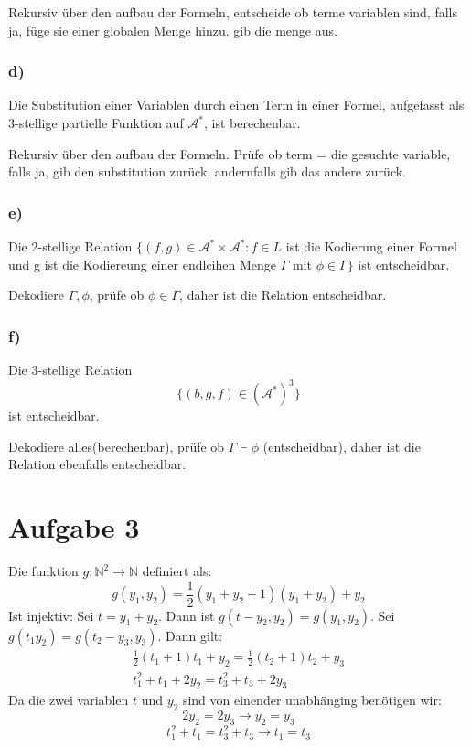 \documentclass[12pt]{article}
\begin{document}
Rekursiv über den aufbau der Formeln, entscheide ob terme variablen sind, falls ja, füge sie einer globalen Menge hinzu. gib die menge aus.

\subsubsection*{d)}
Die Substitution einer Variablen durch einen Term in einer Formel, aufgefasst
als 3-stellige partielle Funktion auf $\mathcal{A}^*$, ist berechenbar.

Rekursiv über den aufbau der Formeln. Prüfe ob term = die gesuchte variable, falls ja,
gib den substitution zurück, andernfalls gib das andere zurück.

\subsubsection*{e)}
Die 2-stellige Relation 
$\{(f,g)\in \mathcal{A}^*\times \mathcal{A}^*:f\in L$ ist die Kodierung einer Formel und g ist die Kodiereung einer endlcihen Menge $\Gamma$ mit $\phi\in\Gamma \} $
ist entscheidbar.

Dekodiere $\Gamma,\phi$, prüfe ob $\phi\in\Gamma$, daher ist die Relation entscheidbar.

\subsubsection*{f)}
Die 3-stellige Relation
\[ \{(b,g,f)\in (\mathcal{A}^*)^3\} \]
ist entscheidbar.

Dekodiere alles(berechenbar), prüfe ob $\Gamma\vdash\phi$ (entscheidbar), daher ist die Relation ebenfalls entscheidbar.
\section*{Aufgabe 3}
Die funktion $g: \mathbb{N}^2 \rightarrow \mathbb{N}$ definiert als:
\begin{equation}
g(y_1, y_2) = \frac{1}{2} (y_1 + y_2 + 1)(y_1 + y_2) + y_2
\end{equation}
Ist injektiv:
Sei $t = y_1 + y_2$. Dann ist $g(t - y_2, y_2) = g(y_1, y_2)$. Sei
$g(t_1 y_2) = g(t_2 - y_3, y_3)$. Dann gilt:
\begin{equation*}
 \begin{split}
 \frac{1}{2} (t_1 + 1)t_1 + y_2 = \frac{1}{2} (t_2 + 1)t_2 + y_3 \\
 t_1^2 + t_1 + 2y_2 = t_3^2 + t_3 + 2y_3
 \end{split}
\end{equation*}
Da die zwei variablen $t$ und $y_2$ sind von einender unabhänging benötigen wir:
\begin{equation}
 2y_2 = 2y_3 \rightarrow y_2 = y_3
\end{equation}
\begin{equation}
 t_1^2 + t_1 = t_3^2 + t_3 \rightarrow t_1 = t_3
\end{equation}
\end{document}
